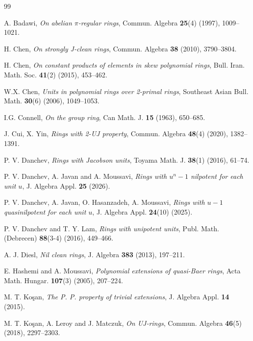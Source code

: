 \documentclass[12pt]{amsart}
\theoremstyle{definition}
\begin{document}

\vskip3.0pc

\begin{thebibliography}{99}
	
A. Badawi, {\it On abelian $\pi$-regular rings}, Commun. Algebra {\bf 25}(4) (1997), 1009--1021.

H. Chen, {\it On strongly J-clean rings}, Commun. Algebra {\bf 38} (2010), 3790--3804.	

H. Chen, {\it On constant products of elements in skew polynomial rings}, Bull. Iran. Math. Soc. {\bf 41}(2) (2015), 453--462.

W.X. Chen, {\it Units in polynomial rings over 2-primal rings}, Southeast Asian Bull. Math. {\bf 30}(6) (2006), 1049--1053.

I.G. Connell, {\it On the group ring}, Can Math. J. {\bf 15} (1963), 650--685.

J. Cui, X. Yin, {\it Rings with 2-UJ property}, Commun. Algebra {\bf 48}(4) (2020), 1382--1391.	

P. V. Danchev, {\it Rings with Jacobson units}, Toyama Math. J. {\bf 38}(1) (2016), 61--74.

P. V. Danchev, A. Javan and A. Moussavi, {\it Rings with $u^n - 1$ nilpotent for each unit $u$}, J. Algebra Appl. {\bf 25} (2026).

P. V. Danchev, A. Javan, O. Hasanzadeh, A. Moussavi, {\it Rings with $u-1$ quasinilpotent for each unit $u$}, J. Algebra Appl. {\bf 24}(10) (2025).

P. V. Danchev and T. Y. Lam, {\it Rings with unipotent units}, Publ. Math. (Debrecen) {\bf 88}(3-4) (2016), 449--466.

A. J. Diesl, {\it Nil clean rings}, J. Algebra {\bf 383} (2013), 197--211.

E. Hashemi and A. Moussavi, {\it Polynomial extensions of quasi-Baer rings}, Acta Math. Hungar. {\bf 107}(3) (2005), 207--224.

M. T. Ko\c{s}an, {\it The P. P. property of trivial extensions}, J. Algebra Appl. {\bf 14} (2015).

M. T. Ko\c{s}an, A. Leroy and J. Matczuk, {\it On UJ-rings}, Commun. Algebra {\bf 46}(5) (2018), 2297--2303.


\end{thebibliography}
\end{document}
